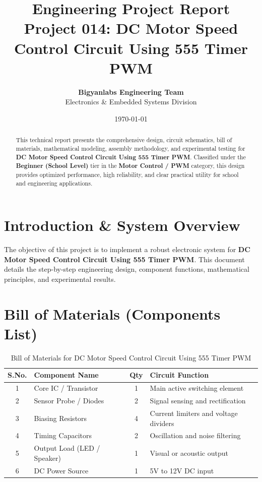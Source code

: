\documentclass[11pt,a4paper]{article}
\title{\textbf{\Huge Engineering Project Report}\\[0.5em] \Large Project 014: DC Motor Speed Control Circuit Using 555 Timer PWM}
\author{\textbf{Bigyanlabs Engineering Team}\\ Electronics \& Embedded Systems Division}
\date{\today}
\begin{document}
\maketitle
\thispagestyle{empty}

\begin{abstract}
This technical report presents the comprehensive design, circuit schematics, bill of materials, mathematical modeling, assembly methodology, and experimental testing for \textbf{DC Motor Speed Control Circuit Using 555 Timer PWM}. Classified under the \textbf{Beginner (School Level)} tier in the \textbf{Motor Control / PWM} category, this design provides optimized performance, high reliability, and clear practical utility for school and engineering applications.
\end{abstract}

\newpage
\tableofcontents
\newpage

\section{Introduction \& System Overview}
The objective of this project is to implement a robust electronic system for \textbf{DC Motor Speed Control Circuit Using 555 Timer PWM}. This document details the step-by-step engineering design, component functions, mathematical principles, and experimental results.

\section{Bill of Materials (Components List)}
\begin{table}[h!]
\centering
\caption{Bill of Materials for DC Motor Speed Control Circuit Using 555 Timer PWM}
\vspace{0.5em}
\begin{tabular}{clcp{7cm}}
\toprule
\textbf{S.No.} & \textbf{Component Name} & \textbf{Qty} & \textbf{Circuit Function} \\
\midrule
1 & Core IC / Transistor & 1 & Main active switching element \\
2 & Sensor Probe / Diodes & 2 & Signal sensing and rectification \\
3 & Biasing Resistors & 4 & Current limiters and voltage dividers \\
4 & Timing Capacitors & 2 & Oscillation and noise filtering \\
5 & Output Load (LED / Speaker) & 1 & Visual or acoustic output \\
6 & DC Power Source & 1 & 5V to 12V DC input \\
\bottomrule
\end{tabular}
\end{table}
\end{document}
